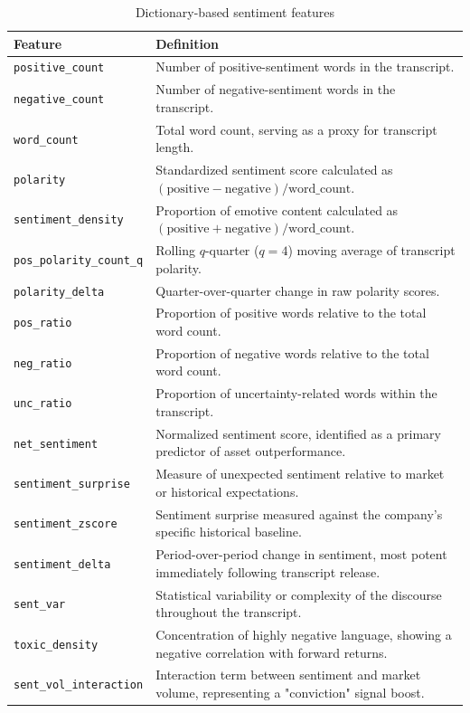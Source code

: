 \documentclass{article}
\begin{document}
\begin{table}[H]
\centering
\caption{Dictionary-based sentiment features}
\label{tab:sentiment_features}
\begin{tabular}{lp{9cm}}
\toprule
\textbf{Feature} & \textbf{Definition} \\
\midrule
\texttt{positive\_count}        & Number of positive-sentiment words in the transcript. \\
\texttt{negative\_count}        & Number of negative-sentiment words in the transcript. \\
\texttt{word\_count}            & Total word count, serving as a proxy for transcript length. \\
\texttt{polarity}               & Standardized sentiment score calculated as $(\text{positive} - \text{negative}) / \text{word\_count}$. \\
\texttt{sentiment\_density}     & Proportion of emotive content calculated as $(\text{positive} + \text{negative}) / \text{word\_count}$. \\
\texttt{pos\_polarity\_count\_q} & Rolling $q$-quarter ($q=4$) moving average of transcript polarity. \\
\texttt{polarity\_delta}        & Quarter-over-quarter change in raw polarity scores. \\
\texttt{pos\_ratio}             & Proportion of positive words relative to the total word count. \\
\texttt{neg\_ratio}             & Proportion of negative words relative to the total word count. \\
\texttt{unc\_ratio}             & Proportion of uncertainty-related words within the transcript. \\
\texttt{net\_sentiment}         & Normalized sentiment score, identified as a primary predictor of asset outperformance. \\
\texttt{sentiment\_surprise}    & Measure of unexpected sentiment relative to market or historical expectations. \\
\texttt{sentiment\_zscore}      & Sentiment surprise measured against the company's specific historical baseline. \\
\texttt{sentiment\_delta}       & Period-over-period change in sentiment, most potent immediately following transcript release. \\
\texttt{sent\_var}              & Statistical variability or complexity of the discourse throughout the transcript. \\
\texttt{toxic\_density}         & Concentration of highly negative language, showing a negative correlation with forward returns. \\
\texttt{sent\_vol\_interaction} & Interaction term between sentiment and market volume, representing a "conviction" signal boost. \\
\bottomrule
\end{tabular}
\end{table}
\end{document}
